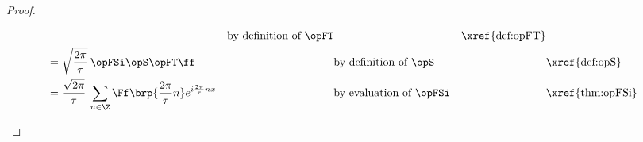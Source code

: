 \begin{proof}
\begin{enumerate}
\begin{align*}
           && \text{by definition of $\opFT$} && \text{\xref{def:opFT}}
         \\&= \sqrt{\frac{2\pi}{\tau}}\: \opFSi\opS\opFT \ff
           && \text{by definition of $\opS$}
           && \text{\xref{def:opS}}
         \\&= \frac{\sqrt{2\pi}}{\tau}\:
              \sum_{n\in\Z} \Ff\brp{\frac{2\pi}{\tau}n} e^{i\frac{2\pi}{\tau}nx}
           && \text{by evaluation of $\opFSi$} && \text{\xref{thm:opFSi}}
    \end{align*}
\end{enumerate}
%
%
%

\end{proof}
